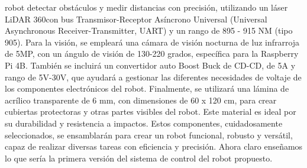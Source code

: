         robot detectar obst\'aculos y medir distancias con precisi\'on, utilizando un l\'aser LiDAR 360\degree con bus Transmisor-Receptor As\'incrono Universal (Universal Asynchronous Receiver-Transmitter, UART) 
        y un rango de 895 - 915 NM (tipo 905).
    \vskip 0.5cm
    Para la visi\'on, se emplear\'a una c\'amara de visi\'on nocturna de luz infrarroja de 5MP, con un \'angulo de visi\'on de 
        130-220 grados, espec\'ifica para la Raspberry Pi 4B. Tambi\'en se incluir\'a un convertidor auto Boost Buck de CD-CD, 
        de 5A y rango de 5V-30V, que ayudar\'a a gestionar las diferentes necesidades de voltaje de los componentes 
        electr\'onicos del robot.
    \vskip 0.5cm
    Finalmente, se utilizar\'a una l\'amina de acr\'ilico transparente de 6 mm, con dimensiones de 60 x 120 cm, 
        para crear cubiertas protectoras y otras partes visibles del robot. Este material es ideal por su 
        durabilidad y resistencia a impactos.
    \vskip 0.5cm
    Estos componentes, cuidadosamente seleccionados, se ensamblar\'an para crear un robot funcional, 
        robusto y vers\'atil, capaz de realizar diversas tareas con eficiencia y precisi\'on.
    \vskip 0.5cm
    Ahora claro ense\~namos lo que ser\'ia la primera versi\'on del sistema de control del robot propuesto.
    
    
    
    
    
    
